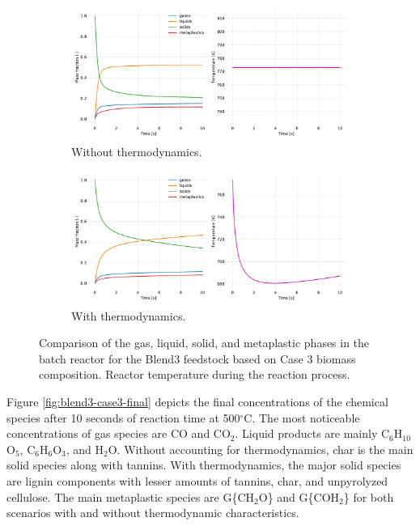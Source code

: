 \begin{figure}[H]
    \begin{subfigure}{\textwidth}
        \centering
    \includegraphics[width=\textwidth]{figures/blend3-case3-phases-temp.pdf}
        \caption{Without thermodynamics.}
    \end{subfigure}
    \begin{subfigure}{\textwidth}
        \centering
    \includegraphics[width=\textwidth]{figures/blend3-case3-phases-temp-thermo.pdf}
        \caption{With thermodynamics.}
    \end{subfigure}
    \caption{Comparison of the gas, liquid, solid, and metaplastic phases in the batch reactor for the Blend3 feedstock based on Case 3 biomass composition. Reactor temperature during the reaction process.}
    \label{fig:blend3-case3-phases-temp}
\end{figure}

Figure \ref{fig:blend3-case3-final} depicts the final concentrations of the chemical species after 10 seconds of reaction time at 500$^{\circ}$C. The most noticeable concentrations of gas species are CO and CO$_2$. Liquid products are mainly C$_6$H$_{10}$O$_5$, C$_6$H$_6$O$_3$, and H$_2$O. Without accounting for thermodynamics, char is the main solid species along with tannins. With thermodynamics, the major solid species are lignin components with lesser amounts of tannins, char, and unpyrolyzed cellulose. The main metaplastic species are G\{CH$_2$O\} and G\{COH$_2$\} for both scenarios with and without thermodynamic characteristics.

